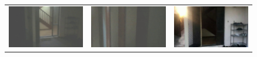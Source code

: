 \documentclass[letterpaper, 10 pt, conference]{ieeeconf}  %
\begin{document}
\begin{figure}[htbp]
\begin{tabular}{ccc}
 \includegraphics[width=\imgW,height=\imgH]{rio-q4-2} &
 \includegraphics[width=\imgW,height=\imgH]{rio-rf4-2} &
 \includegraphics[width=\imgW,height=\imgH]{rio-r4} \\
 

\end{tabular}
\end{figure}
\end{document}

